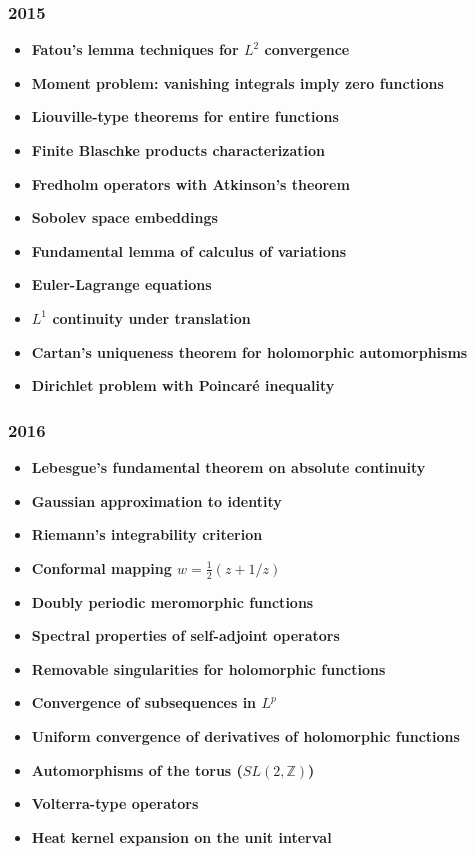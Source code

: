 \subsubsection*{2015}
\begin{itemize}
    \item \textbf{Fatou's lemma techniques for $L^2$ convergence}
    \item \textbf{Moment problem: vanishing integrals imply zero functions}
    \item \textbf{Liouville-type theorems for entire functions}
    \item \textbf{Finite Blaschke products characterization}
    \item \textbf{Fredholm operators with Atkinson's theorem}
    \item \textbf{Sobolev space embeddings}
    \item \textbf{Fundamental lemma of calculus of variations}
    \item \textbf{Euler-Lagrange equations}
    \item \textbf{$L^1$ continuity under translation}
    \item \textbf{Cartan's uniqueness theorem for holomorphic automorphisms}
    \item \textbf{Dirichlet problem with Poincar\'e inequality}
\end{itemize}

\subsubsection*{2016}
\begin{itemize}
    \item \textbf{Lebesgue's fundamental theorem on absolute continuity}
    \item \textbf{Gaussian approximation to identity}
    \item \textbf{Riemann's integrability criterion}
    \item \textbf{Conformal mapping $w = \frac{1}{2}(z + 1/z)$}
    \item \textbf{Doubly periodic meromorphic functions}
    \item \textbf{Spectral properties of self-adjoint operators}
    \item \textbf{Removable singularities for holomorphic functions}
    \item \textbf{Convergence of subsequences in $L^p$}
    \item \textbf{Uniform convergence of derivatives of holomorphic functions}
    \item \textbf{Automorphisms of the torus ($SL(2,\mathbb{Z})$)}
    \item \textbf{Volterra-type operators}
    \item \textbf{Heat kernel expansion on the unit interval}
\end{itemize}

